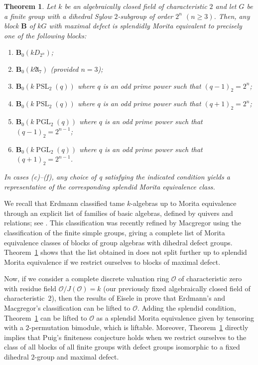 \documentclass[11pt,a4paper,twoside]{amsart}
\newcommand{\fA}{{\mathfrak{A}}}
\newcommand{\cO}{{\mathcal{O}}}
\newcommand{\bB}{{\mathbf{B}}}
\DeclareMathOperator{\PSL}{PSL}
\DeclareMathOperator{\PGL}{PGL}
\newtheorem{thm}{Theorem}[section]
\newtheorem{cor}[thm]{Corollary}
\theoremstyle{defnew}
\theoremstyle{remark}
\theoremstyle{plain}
\begin{document}
\begin{thm}\label{thm:mainthm_intro}
   Let $k$ be an algebraically closed field of characteristic $2$ and let $G$ be a finite group with a dihedral Sylow $2$-subgroup of order $2^n$ $(n\geq 3)$. Then, any block $\bB$ of $kG$ with maximal defect is splendidly Morita equivalent to precisely one of the following blocks: 
    \begin{enumerate}[label=\rm(\alph*)]
       \item $\bB_0(kD_{2^n})$; 
       \item $\bB_0(k\fA_7)$  (provided $n=3$); 
       \item $\bB_0(k\!\PSL_2(q))$ where $q$ is an odd prime power such that  $(q-1)_2=2^{n}$;
       \item $\bB_0(k\!\PSL_2(q))$ where $q$ is an odd prime power such that  $(q+1)_2=2^{n}$;
       \item $\bB_0(k\!\PGL_2(q))$ where $q$ is an odd prime power such that  $(q-1)_2=2^{n-1}$;
       \item $\bB_0(k\!\PGL_2(q))$ where $q$ is an odd prime power such that  $(q+1)_2=2^{n-1}$.
    \end{enumerate}
     In cases {\rm(c)--(f)}, any choice of q satisfying the indicated condition yields a representative of the corresponding splendid Morita equivalence class.   
 \end{thm}  

We recall that Erdmann classified tame $k$-algebras up to Morita equivalence through an explicit list of families of basic algebras, defined by quivers and relations; see \cite{ErdmannTameBook}. This classification was recently refined by Macgregor \cite{MacGregor22} using the classification of the finite
simple groups, giving a complete list of Morita equivalence classes of blocks of group algebras with dihedral defect groups.
Theorem~\ref{thm:mainthm_intro} shows that the list obtained in
\cite{MacGregor22} does not split further up to splendid Morita equivalence if we restrict ourselves to blocks of maximal defect.

Now, if we consider a complete discrete valuation ring $\cO$  of characteristic zero with residue field $\cO/J(\cO)=k$ (our previously fixed algebraically closed field of characteristic~$2$), then the results of Eisele in \cite{Eiselethesis} prove that Erdmann's and Macgregor's classification can be lifted to $\cO$.  Adding the splendid condition, 
Theorem~\ref{thm:mainthm_intro} can be lifted to $\cO$ as a splendid Morita equivalence given by tensoring with a $2$-permutation bimodule, which is liftable.
Moreover, Theorem~\ref{thm:mainthm_intro}   directly implies that Puig's finiteness conjecture holds when we restrict ourselves to the class of all blocks of all finite groups with defect groups isomorphic to a fixed dihedral $2$-group and maximal defect.
\end{document}
